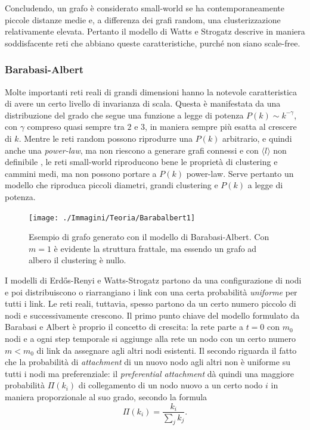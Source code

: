Concludendo, un grafo è considerato small-world se ha contemporaneamente piccole distanze medie e, a differenza dei grafi random,  una clusterizzazione relativamente elevata. Pertanto il modello di Watts e Strogatz descrive in maniera soddisfacente reti che abbiano queste caratteristiche, purché non siano scale-free.

\subsubsection{Barabasi-Albert} 
Molte importanti reti reali di grandi dimensioni hanno la notevole caratteristica di avere un certo livello di invarianza di scala. Questa è manifestata da una distribuzione del grado che segue una funzione a legge di potenza $P(k)\sim k^{-\gamma}$, con $\gamma$ compreso quasi sempre tra $2$ e $3$, in maniera sempre più esatta al crescere di $k$. Mentre le reti random possono riprodurre una $P(k)$ arbitrario, e quindi anche una \emph{power-law}, ma non riescono a generare grafi connessi e con $\langle l \rangle$ non definibile \parencite{Barbalbert2002}, le reti small-world riproducono bene le proprietà di clustering e cammini medi, ma non possono portare a $P(k)$ power-law. Serve pertanto un modello che riproduca piccoli diametri, grandi clustering e $P(k)$ a legge di potenza.

\begin{figure}[t!]
	\centering
	\texttt{[image: ./Immagini/Teoria/Barabalbert1]}
	\caption[Albero scale-free]{Esempio di grafo generato con il modello di Barabasi-Albert. Con $m=1$ \`e evidente la struttura frattale, ma essendo un grafo ad albero il clustering \`e nullo.}
	\label{fig:barabalbero}
\end{figure}

I modelli di Erdős-Renyi e Watts-Strogatz partono da una configurazione di nodi e poi distribuiscono o riarrangiano i link con una certa probabilità \emph{uniforme} per tutti i link. Le reti reali, tuttavia, spesso partono da un certo numero piccolo di nodi e successivamente crescono. Il primo punto chiave del modello formulato da Barabasi e Albert è proprio il concetto di crescita: la rete parte a $t=0$ con $m_0$ nodi e a ogni step temporale si aggiunge alla rete un nodo con un certo numero $m < m_0$ di link da assegnare agli altri nodi esistenti. Il secondo riguarda il fatto che la probabilità di \emph{attachment} di un nuovo nodo agli altri non è uniforme su tutti i nodi ma preferenziale: il \emph{preferential attachment} dà quindi una maggiore probabilità $\Pi (k_i)$ di collegamento di un nodo nuovo a un certo nodo $i$ in maniera proporzionale al suo grado, secondo la formula
\[\Pi (k_i) = \frac{k_i}{\sum_j k_j}.\]

